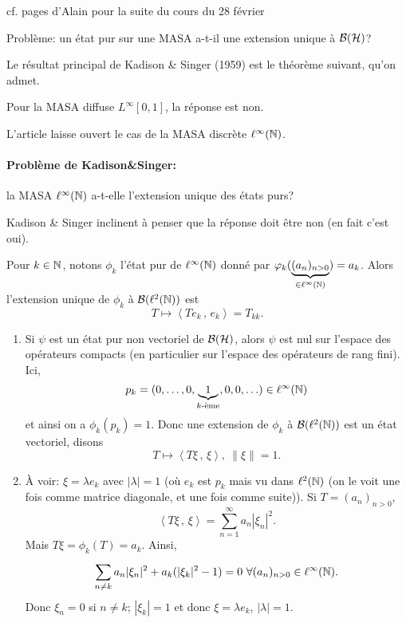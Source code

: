 cf. pages d'Alain pour la suite du cours du 28 février



Problème: un état pur sur une MASA a-t-il une extension unique à $\mathcal{B}(\mathcal{H})$?

Le résultat principal de Kadison \& Singer (1959) est le théorème suivant, qu'on admet.

\begin{theo}
  Pour la MASA diffuse $L^{\infty}[0,1]$, la réponse est non.
\end{theo}

L'article laisse ouvert le cas de la MASA discrète $\ell^\infty(\mathbb{N})$.

\paragraph{Problème de Kadison\&Singer:} la MASA $\ell^\infty(\mathbb{N})$ a-t-elle l'extension unique des états purs?

Kadison \& Singer inclinent à penser que la réponse doit être non (en fait c'est oui).

\begin{prop}
  Pour $k \in \mathbb{N}$, notons $\phi_k$ l'état pur de $\ell^\infty(\mathbb{N})$ donné par $\varphi_k(\underbrace{(a_n)_{n >
      0}}_{\in \ell^\infty(\mathbb{N})}) = a_k$. Alors l'extension unique de $\phi_k$ à $\mathcal{B}(\ell^2(\mathbb{N}))$ est 
  \[ T \mapsto \left \langle T e_k\, ,\, e_k \right \rangle = T_{kk}. \]
\end{prop}

\begin{preuve}
  \begin{enumerate}
  \item Si $\psi$ est un état pur non vectoriel de $\mathcal{B}(\mathcal{H})$, alors $\psi$ est nul sur l'espace des opérateurs
    compacts (en particulier sur l'espace des opérateurs de rang fini). Ici, 
    \[ p_k = (0, \ldots, 0, \underbrace{1}_{k\text{-ème}}, 0, 0, \ldots) \in \ell^\infty(\mathbb{N}) \]
    et ainsi on a $\phi_k(p_k) = 1$. Donc une extension de $\phi_k$ à $\mathcal{B}(\ell^2(\mathbb{N}))$ est un état vectoriel,
    disons 
    \[ T \mapsto \left \langle T \xi\, ,\, \xi \right \rangle ,\ \|\xi\| = 1. \]
    
  \item À voir: $\xi = \lambda e_k$ avec $|\lambda| = 1$ (où $e_k$ est $p_k$ mais vu dans $\ell^2(\mathbb{N})$ (on le
    voit une fois comme matrice diagonale, et une fois comme suite)). Si $T = (a_n)_{n > 0}$, 
    \[ \left \langle T \xi\, ,\, \xi \right \rangle = \sum_{n = 1}^{\infty} a_n |\xi_n|^2. \]
    Mais $T \xi = \phi_k(T) = a_k$. Ainsi, 
    \[ \sum_{n\neq k}^{}a_n |\xi_n|^2 + a_k(|\xi_k|^2 - 1) = 0\ \forall (a_n)_{n > 0} \in \ell^\infty(\mathbb{N}). \]
    Donc $\xi_n = 0$ si $n \neq k$; $|\xi_k| = 1$ et donc $\xi = \lambda e_k$, $|\lambda| = 1$.
  \end{enumerate}
\end{preuve}

